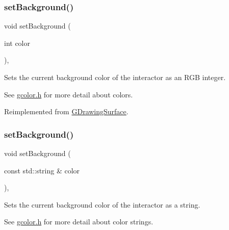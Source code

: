 \mbox{\label{classGWindow_a10d305826534b55561ea88730fc9f6cd}} 
\subsubsection{\texorpdfstring{set\+Background()}{setBackground()}\hspace{0.1cm}{\footnotesize\ttfamily [1/2]}}
{\footnotesize\ttfamily void set\+Background (\begin{DoxyParamCaption}\item[{int}]{color }\end{DoxyParamCaption})\hspace{0.3cm}{\ttfamily [override]}, {\ttfamily [virtual]}}



Sets the current background color of the interactor as an R\+GB integer. 

See \mbox{\hyperlink{gcolor_8h_source}{gcolor.\+h}} for more detail about colors. 

Reimplemented from \mbox{\hyperlink{classGDrawingSurface_aba673fd56570a074aba10fa059524b96}{G\+Drawing\+Surface}}.

\mbox{\label{classGWindow_a9cb99695b93494c7ba28268ce9e42c2a}} 
\subsubsection{\texorpdfstring{set\+Background()}{setBackground()}\hspace{0.1cm}{\footnotesize\ttfamily [2/2]}}
{\footnotesize\ttfamily void set\+Background (\begin{DoxyParamCaption}\item[{const std\+::string \&}]{color }\end{DoxyParamCaption})\hspace{0.3cm}{\ttfamily [override]}, {\ttfamily [virtual]}}



Sets the current background color of the interactor as a string. 

See \mbox{\hyperlink{gcolor_8h_source}{gcolor.\+h}} for more detail about color strings. 

